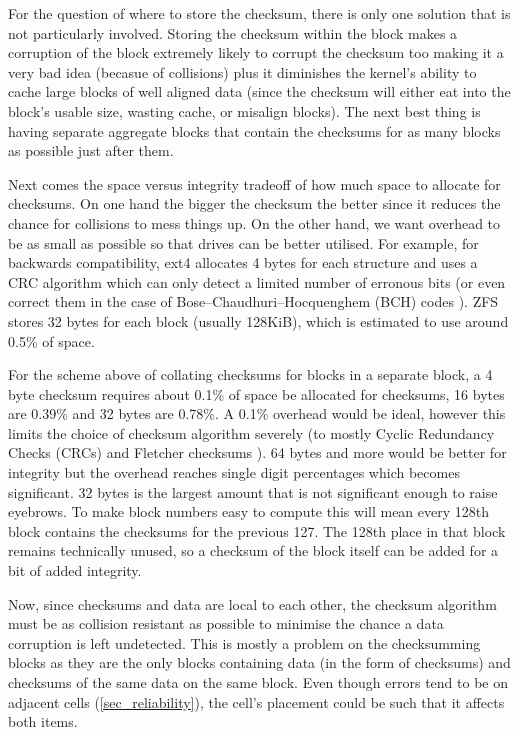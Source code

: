         For the question of where to store the checksum, there is only one
        solution that is not particularly involved. Storing the checksum within
        the block makes a corruption of the block extremely likely to corrupt
        the checksum too making it a very bad idea (becasue of collisions) plus
        it diminishes the kernel's ability to cache large blocks of well
        aligned data (since the checksum will either eat into the block's
        usable size, wasting cache, or misalign blocks). The next best thing is
        having separate aggregate blocks that contain the checksums for as many
        blocks as possible just after them.

        Next comes the space versus integrity tradeoff of how much space to
        allocate for checksums. On one hand the bigger the checksum the better
        since it reduces the chance for collisions to mess things up. On the
        other hand, we want overhead to be as small as possible so that drives
        can be better utilised. For example, for backwards compatibility, ext4
        allocates 4 bytes for each structure \cite{ext4_docs} and uses a CRC
        algorithm which can only detect a limited number of erronous bits (or
        even correct them in the case of Bose–Chaudhuri–Hocquenghem (BCH) codes
        \cite{flash_error_manual}). ZFS stores 32 bytes \cite{ZFS_docs} for
        each block (usually 128KiB), which is estimated to use around 0.5\%
        \cite{ZFS_overhead} of space.

        For the scheme above of collating checksums for blocks in a separate
        block, a 4 byte checksum requires about 0.1\% of space be allocated for
        checksums, 16 bytes are 0.39\% and 32 bytes are 0.78\%. A 0.1\%
        overhead would be ideal, however this limits the choice of checksum
        algorithm severely (to mostly Cyclic Redundancy Checks (CRCs) and
        Fletcher checksums \cite{embedded_checksums}). 64 bytes and more would
        be better for integrity but the overhead reaches single digit
        percentages which becomes significant. 32 bytes is the largest amount
        that is not significant enough to raise eyebrows. To make block numbers
        easy to compute this will mean every 128th block contains the checksums
        for the previous 127. The 128th place in that block remains technically
        unused, so a checksum of the block itself can be added for a bit of
        added integrity.

        Now, since checksums and data are local to each other, the checksum
        algorithm must be as collision resistant as possible to minimise the
        chance a data corruption is left undetected. This is mostly a problem
        on the checksumming blocks as they are the only blocks containing data
        (in the form of checksums) and checksums of the same data on the same
        block. Even though errors tend to be on adjacent cells
        (\ref{sec_reliability}), the cell's placement could be such that it
        affects both items.

